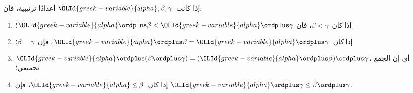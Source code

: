 \documentclass[../../../include/open-logic-section]{subfiles}
\begin{document}
\begin{lem}
إذا كانت~$\OLId{greek-variable}{alpha}, \beta, \gamma$ أعدادًا ترتيبية، فإن:
\begin{enumerate}
	\item{} إذا كان~$\beta < \gamma$، فإن
	$\OLId{greek-variable}{alpha} \ordplus \beta < \OLId{greek-variable}{alpha} \ordplus \gamma$؛
	\item{} إذا كان~$\OLId{greek-variable}{alpha} \ordplus \beta =
	\OLId{greek-variable}{alpha}\ordplus \gamma$، فإن~$\beta = \gamma$؛
	\item{} $\OLId{greek-variable}{alpha} \ordplus (\beta \ordplus
	\gamma) = (\OLId{greek-variable}{alpha} \ordplus \beta) \ordplus \gamma$، أي إن الجمع
	تجميعي؛
	\item{} إذا كان~$\OLId{greek-variable}{alpha} \leq \beta$، فإن
	$\OLId{greek-variable}{alpha} \ordplus \gamma \leq \beta \ordplus \gamma$.
\end{enumerate}
\end{lem}
\end{document}
